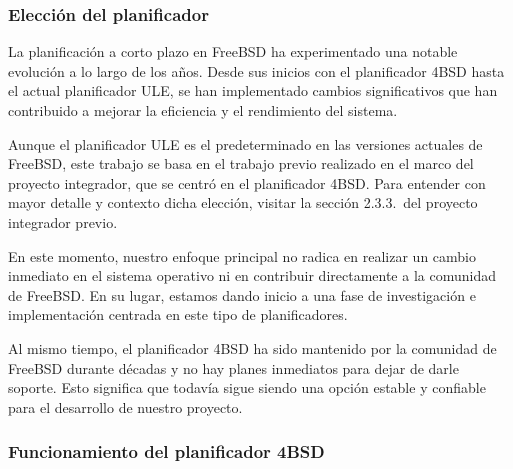 \subsubsection{Elección del planificador}

La planificación a corto plazo en FreeBSD ha experimentado una notable evolución a lo largo de los años. Desde sus inicios con el planificador 4BSD hasta el actual planificador ULE, se han implementado cambios significativos que han contribuido a mejorar la eficiencia y el rendimiento del sistema.\par

Aunque el planificador ULE es el predeterminado en las versiones actuales de FreeBSD, este trabajo se basa en el trabajo previo realizado en el marco del proyecto integrador, que se centró en el planificador 4BSD\@. Para entender con mayor detalle y contexto dicha elección, visitar la sección 2.3.3.\ del proyecto integrador previo\cite{bib1}.

En este momento, nuestro enfoque principal no radica en realizar un cambio inmediato en el sistema operativo ni en contribuir directamente a la comunidad de FreeBSD\@. En su lugar, estamos dando inicio a una fase de investigación e implementación centrada en este tipo de planificadores.\par

Al mismo tiempo, el planificador 4BSD ha sido mantenido por la comunidad de FreeBSD durante décadas y no hay planes inmediatos para dejar de darle soporte. Esto significa que todavía sigue siendo una opción estable y confiable para el desarrollo de nuestro proyecto.\par

\subsubsection{Funcionamiento del planificador 4BSD}
